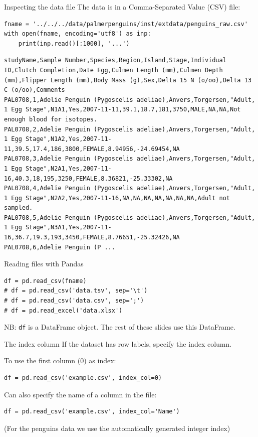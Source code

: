 \documentclass[aspectratio=169,usenames,dvipsnames]{beamer}
\begin{document}
\begin{frame}[fragile]{Inspecting the data file}
The data is in a Comma-Separated Value (CSV) file:
\begin{lstlisting}
fname = '../../../data/palmerpenguins/inst/extdata/penguins_raw.csv'
with open(fname, encoding='utf8') as inp:
    print(inp.read()[:1000], '...')
\end{lstlisting}

\vspace{-1em}
\begin{lstlisting}[style=plainscript]
studyName,Sample Number,Species,Region,Island,Stage,Individual ID,Clutch Completion,Date Egg,Culmen Length (mm),Culmen Depth (mm),Flipper Length (mm),Body Mass (g),Sex,Delta 15 N (o/oo),Delta 13 C (o/oo),Comments
PAL0708,1,Adelie Penguin (Pygoscelis adeliae),Anvers,Torgersen,"Adult, 1 Egg Stage",N1A1,Yes,2007-11-11,39.1,18.7,181,3750,MALE,NA,NA,Not enough blood for isotopes.
PAL0708,2,Adelie Penguin (Pygoscelis adeliae),Anvers,Torgersen,"Adult, 1 Egg Stage",N1A2,Yes,2007-11-11,39.5,17.4,186,3800,FEMALE,8.94956,-24.69454,NA
PAL0708,3,Adelie Penguin (Pygoscelis adeliae),Anvers,Torgersen,"Adult, 1 Egg Stage",N2A1,Yes,2007-11-16,40.3,18,195,3250,FEMALE,8.36821,-25.33302,NA
PAL0708,4,Adelie Penguin (Pygoscelis adeliae),Anvers,Torgersen,"Adult, 1 Egg Stage",N2A2,Yes,2007-11-16,NA,NA,NA,NA,NA,NA,NA,Adult not sampled.
PAL0708,5,Adelie Penguin (Pygoscelis adeliae),Anvers,Torgersen,"Adult, 1 Egg Stage",N3A1,Yes,2007-11-16,36.7,19.3,193,3450,FEMALE,8.76651,-25.32426,NA
PAL0708,6,Adelie Penguin (P ...
\end{lstlisting}
\end{frame}

\begin{frame}[fragile]{Reading files with Pandas}
\begin{lstlisting}
df = pd.read_csv(fname)
# df = pd.read_csv('data.tsv', sep='\t')
# df = pd.read_csv('data.csv', sep=';')
# df = pd.read_excel('data.xlsx')
\end{lstlisting}

\vspace{1em}
NB: \lstinline|df| is a DataFrame object.
The rest of these slides use this DataFrame.
\end{frame}

\begin{frame}[fragile]{The index column}
If the dataset has row labels, specify the index column.

\vspace{1em}
To use the first column (0) as index:
\begin{lstlisting}
df = pd.read_csv('example.csv', index_col=0)
\end{lstlisting}

Can also specify the name of a column in the file:

\begin{lstlisting}
df = pd.read_csv('example.csv', index_col='Name')
\end{lstlisting}

\vspace{1em}
(For the penguins data we use the automatically generated integer index)
\end{frame}
\end{document}
